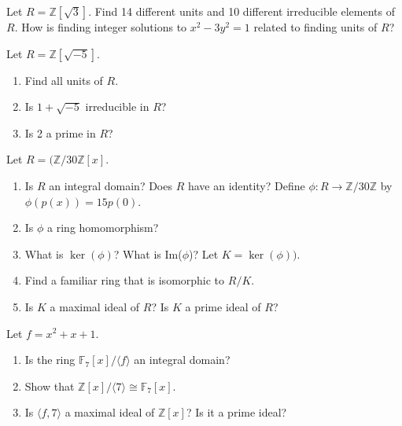 \documentclass[12pt,letterpaper,boxed]{hmcpset}
\begin{document}


\begin{problem}[18.1.20]
Let $R = \mathbb{Z}[\sqrt{3}]$. Find 14 different units and 10 different irreducible elements of $R$. How is finding integer solutions to $x^2 - 3y^2 = 1$ related to finding units of $R$?
\end{problem}

\begin{solution}
\end{solution}

\clearpage

\begin{problem}[18.1.21]
Let $R = \mathbb{Z}[\sqrt{-5}]$.
\begin{enumerate}[label=\alph*]
\item Find all units of $R$.
\item Is $1 + \sqrt{-5}$ irreducible in $R$?
\item Is 2 a prime in $R$?
\end{enumerate}
\end{problem}

\begin{solution}
\end{solution}

\clearpage

\begin{problem}[18.1.27]
Let $R = (\mathbb{Z}/30\mathbb{Z}[x]$.
\begin{enumerate}[label=\alph*]
\item Is $R$ an integral domain? Does  $R$ have an identity?
\newline Define $\phi: R \rightarrow \mathbb{Z}/30\mathbb{Z}$ by $\phi(p(x)) = 15p(0)$.
\item Is $\phi$ a ring homomorphism?
\item What is $\ker(\phi)$? What is Im($\phi$)?
\newline Let $K = \ker(\phi))$.
\item Find a familiar ring that is isomorphic to $R/K$.
\item Is $K$ a maximal ideal of $R$? Is $K$ a prime ideal of $R$?
\end{enumerate}
\end{problem}

\begin{solution}
\end{solution}

\clearpage

\begin{problem}[18.1.29]
Let $f = x^2 + x + 1$.
\begin{enumerate}[label=\alph*]
\item Is the ring $\mathbb{F}_7[x]/\langle f \rangle$ an integral domain?
\item Show that $\mathbb{Z}[x]/\langle 7 \rangle \cong \mathbb{F}_7[x]$.
\item Is $\langle f,7 \rangle $ a maximal ideal of $\mathbb{Z}[x]$? Is it a prime ideal?
\end{enumerate}
\end{problem}
\end{document}
